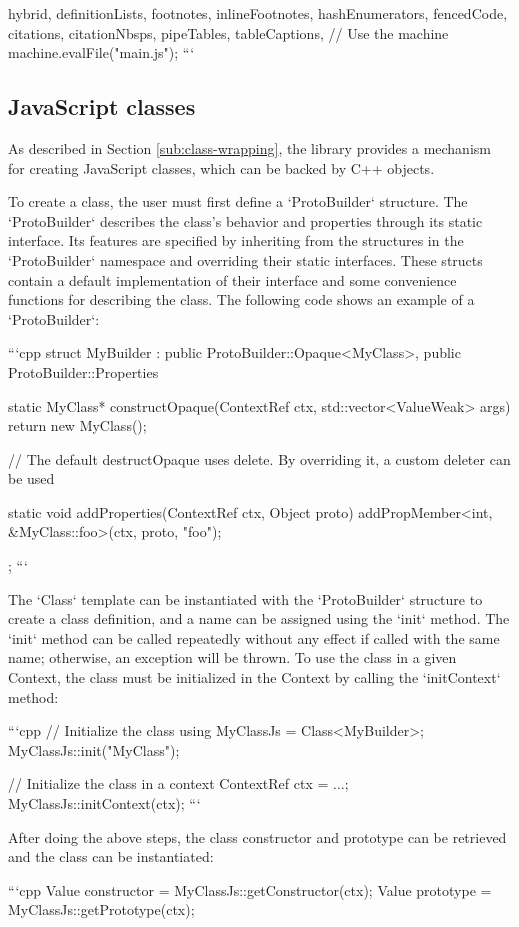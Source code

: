 \begin{markdown*}{%
  hybrid,
  definitionLists,
  footnotes,
  inlineFootnotes,
  hashEnumerators,
  fencedCode,
  citations,
  citationNbsps,
  pipeTables,
  tableCaptions,
}
// Use the machine
machine.evalFile("main.js");
```


\subsection{JavaScript classes}

As described in Section \ref{sub:class-wrapping}, the library provides a mechanism for creating JavaScript classes, which can be backed by C++ objects.

To create a class, the user must first define a `ProtoBuilder` structure. The `ProtoBuilder` describes the class's behavior and properties through its static interface. Its features are specified by inheriting from the structures in the `ProtoBuilder` namespace and overriding their static interfaces. These structs contain a default implementation of their interface and some convenience functions for describing the class. The following code shows an example of a `ProtoBuilder`:

```cpp
struct MyBuilder : public ProtoBuilder::Opaque<MyClass>, public ProtoBuilder::Properties {
  static MyClass* constructOpaque(ContextRef ctx, std::vector<ValueWeak> args) {
    return new MyClass();
  }

  // The default destructOpaque uses delete. By overriding it, a custom deleter can be used

  static void addProperties(ContextRef ctx, Object proto) {
    addPropMember<int, &MyClass::foo>(ctx, proto, "foo");
  }
};
```

The `Class` template can be instantiated with the `ProtoBuilder` structure to create a class definition, and a name can be assigned using the `init` method. The `init` method can be called repeatedly without any effect if called with the same name; otherwise, an exception will be thrown. To use the class in a given Context, the class must be initialized in the Context by calling the `initContext` method:

```cpp
// Initialize the class
using MyClassJs = Class<MyBuilder>;
MyClassJs::init("MyClass");

// Initialize the class in a context
ContextRef ctx = ...;
MyClassJs::initContext(ctx);
```

After doing the above steps, the class constructor and prototype can be retrieved and the class can be instantiated:

```cpp
Value constructor = MyClassJs::getConstructor(ctx);
Value prototype = MyClassJs::getPrototype(ctx);


\end{markdown*}
